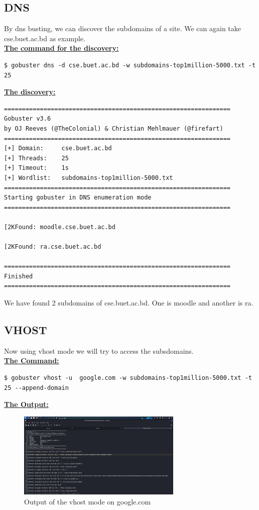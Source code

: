 \documentclass[12 pt]{article}
\begin{document}
\subsection{DNS}
By dns busting, we can discover the subdomains of a site. We can again take cse.buet.ac.bd as example. \\
\textbf{\underline{The command for the discovery:}}
\begin{lstlisting}
$ gobuster dns -d cse.buet.ac.bd -w subdomains-top1million-5000.txt -t 25 
\end{lstlisting}
\textbf{\underline{The discovery:}}
\begin{lstlisting}
===============================================================
Gobuster v3.6
by OJ Reeves (@TheColonial) & Christian Mehlmauer (@firefart)
===============================================================
[+] Domain:     cse.buet.ac.bd
[+] Threads:    25
[+] Timeout:    1s
[+] Wordlist:   subdomains-top1million-5000.txt
===============================================================
Starting gobuster in DNS enumeration mode
===============================================================

[2KFound: moodle.cse.buet.ac.bd

[2KFound: ra.cse.buet.ac.bd

===============================================================
Finished
===============================================================
\end{lstlisting}
We have found 2 subdomains of cse.buet.ac.bd. One is moodle and another is ra.
\subsection{VHOST}
Now using vhost mode we will try to access the subsdomains. \\
\textbf{\underline{The Command: }}\\
\begin{lstlisting}
$ gobuster vhost -u  google.com -w subdomains-top1million-5000.txt -t 25 --append-domain    
\end{lstlisting}
\textbf{\underline{The Output:}}
\begin{figure}[H]
    \centering
    \includegraphics[width=0.7\textwidth]{1.png}
    \caption{Output of the vhost mode on google.com}
    \label{fig: vhost Output}
\end{figure}
\end{document}
